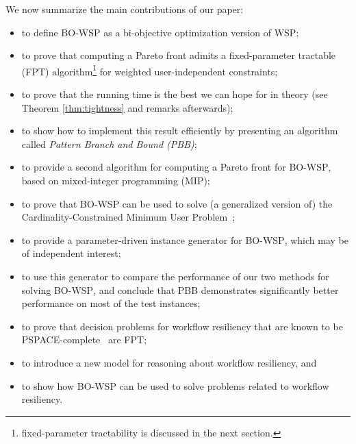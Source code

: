 \documentclass[jcs,crcready]{iosart1c}
\newcommand{\BOWSP}{\textsc{BO-WSP}\xspace}
\begin{document}
We now summarize the main contributions of our paper:
\begin{itemize}
  \item to define \BOWSP as a bi-objective optimization version of WSP;
  \item to prove that computing a Pareto front admits a fixed-parameter tractable (FPT) algorithm\footnote{fixed-parameter tractability is discussed in the next section.} for weighted user-independent constraints;
  \item to prove that the running time is the best we can hope for in theory (see Theorem \ref{thm:tightness} and remarks afterwards);
  \item to show how to implement this result efficiently by presenting an algorithm called \emph{Pattern Branch and Bound (PBB)};
  \item to provide a second algorithm for computing a Pareto front for \BOWSP, based on mixed-integer programming (MIP);
  \item to prove that \BOWSP can be used to solve (a generalized version of) the Cardinality-Constrained Minimum User Problem~\cite{Roy2015};
  \item to provide a parameter-driven instance generator for \BOWSP, which may be of independent interest;
  \item to use this generator to compare the performance of our two methods for solving \BOWSP, and conclude that PBB demonstrates significantly better performance on most of the test instances;
  \item to prove that decision problems for workflow resiliency that are known to be PSPACE-complete~\cite{WaLi10} are FPT;
  \item to introduce a new model for reasoning about workflow resiliency, and 
  \item to show how \BOWSP can be used to solve problems related to workflow resiliency. 
\end{itemize}
\end{document}
